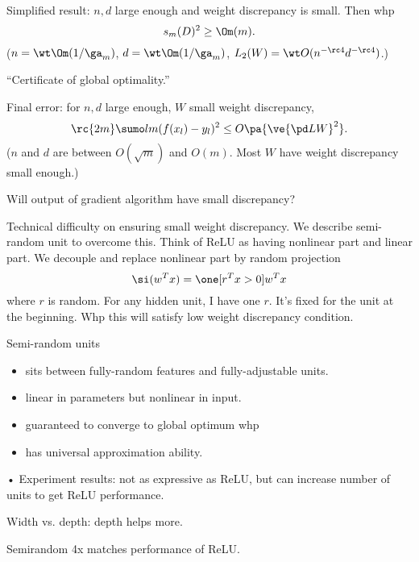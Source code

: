 Simplified result: $n,d$ large enough and weight discrepancy is small. Then whp 
$$s_m(D)^2\ge \Om(m).$$
($n=\wt\Om(1/\ga_m)$, $d=\wt \Om(1/\ga_m)$, $L_2(W) = \wt O(n^{-\rc 4}d^{-\rc 4})$.)


``Certificate of global optimality.''

Final error: for $n,d$ large enough, $W$ small weight discrepancy,
$$
\rc{2m}\sumo lm (f(x_l)-y_l)^2 \le O\pa{\ve{\pd LW}^2}.
$$
($n$ and $d$ are between $O(\sqrt m)$ and $O(m)$. Most $W$ have weight discrepancy small enough.)

Will output of gradient algorithm have small discrepancy?


Technical difficulty on ensuring small weight discrepancy. We describe semi-random unit to overcome this.
Think of ReLU as having nonlinear part and linear part. We decouple and replace nonlinear part by random projection
$$\si(w^T x) = \one[r^Tx>0] w^Tx$$
where $r$ is random.
For any hidden unit, I have one $r$. It's fixed for the unit at the beginning. Whp this will satisfy low weight discrepancy condition.

Semi-random units
\begin{itemize}
\item
sits between fully-random features and fully-adjustable units.
\item
linear in parameters but nonlinear in input.
\item
guaranteed to converge to global optimum whp
\item
has universal approximation ability.
\end{itemize}•
Experiment results: not as expressive as ReLU, but can increase number of units to get ReLU performance. 

Width vs. depth: depth helps more.

Semirandom 4x matches performance of ReLU. 

